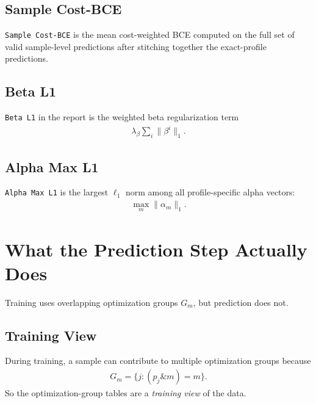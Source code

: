 \documentclass[11pt]{article}
\begin{document}
\subsection{Sample Cost-BCE}
\texttt{Sample Cost-BCE} is the mean cost-weighted BCE computed on the full set
of valid sample-level predictions after stitching together the exact-profile
predictions.

\subsection{Beta L1}
\texttt{Beta L1} in the report is the weighted beta regularization term
\begin{align}
\lambda_\beta \sum_i \|\beta^i\|_1.
\end{align}

\subsection{Alpha Max L1}
\texttt{Alpha Max L1} is the largest $\ell_1$ norm among all profile-specific
alpha vectors:
\begin{align}
\max_m \|\alpha_m\|_1.
\end{align}

\section{What the Prediction Step Actually Does}
Training uses overlapping optimization groups $G_m$, but prediction does not.

\subsection{Training View}
During training, a sample can contribute to multiple optimization groups because
\begin{align}
G_m = \{j : (p_j \mathbin{\&} m) = m \}.
\end{align}
So the optimization-group tables are a \emph{training view} of the data.
\end{document}
